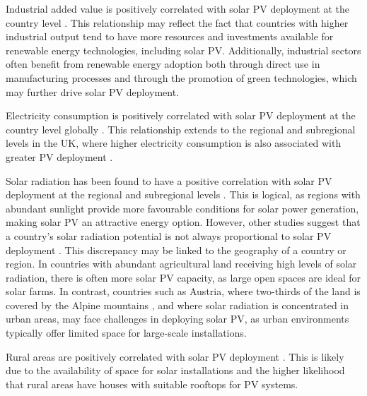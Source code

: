 Industrial added value is positively correlated with solar PV deployment at the country level \cite{alghanem_global_2024,liu_forecasting_2022}. This relationship may reflect the fact that countries with higher industrial output tend to have more resources and investments available for renewable energy technologies, including solar PV. Additionally, industrial sectors often benefit from renewable energy adoption both through direct use in manufacturing processes and through the promotion of green technologies, which may further drive solar PV deployment.

Electricity consumption is positively correlated with solar PV deployment at the country level globally \cite{alghanem_global_2024}. This relationship extends to the regional and subregional levels in the UK, where higher electricity consumption is also associated with greater PV deployment \cite{alderete_peralta_spatio-temporal_2022,laura_williams_identifying_2012,balta-ozkan_regional_2015,collier_distributed_2023}.

Solar radiation has been found to have a positive correlation with solar PV deployment at the regional and subregional levels \cite{westacott_novel_2016,yu_deepsolar_2018,aklin_geography_2018,balta-ozkan_regional_2015}. This is logical, as regions with abundant sunlight provide more favourable conditions for solar power generation, making solar PV an attractive energy option. However, other studies suggest that a country's solar radiation potential is not always proportional to solar PV deployment \cite{celik_review_2020,alghanem_global_2024}. This discrepancy may be linked to the geography of a country or region. In countries with abundant agricultural land receiving high levels of solar radiation, there is often more solar PV capacity, as large open spaces are ideal for solar farms. In contrast, countries such as Austria, where two-thirds of the land is covered by the Alpine mountains \cite{kanonier_arthur_spatial_2018}, and where solar radiation is concentrated in urban areas, may face challenges in deploying solar PV, as urban environments typically offer limited space for large-scale installations. 




Rural areas are positively correlated with solar PV deployment \cite{westacott_novel_2016,laura_williams_identifying_2012,aklin_geography_2018}. This is likely due to the availability of space for solar installations and the higher likelihood that rural areas have houses with suitable rooftops for PV systems. 

